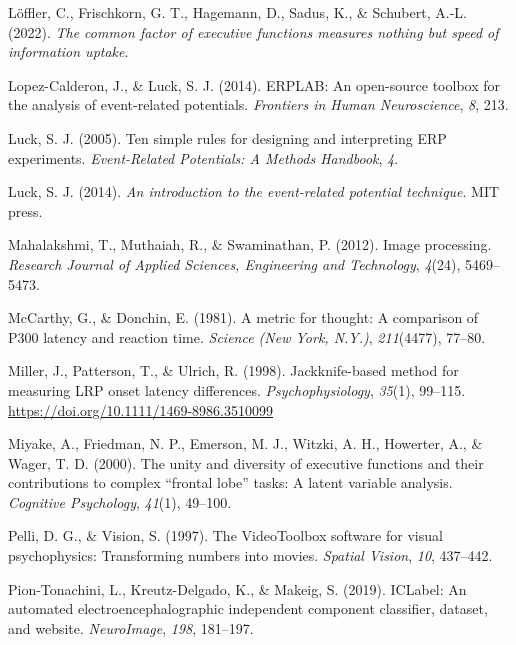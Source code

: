 \documentclass[
  man]{apa7}
\newlength{\cslhangindent}
\newlength{\cslentryspacingunit} %
\newenvironment{CSLReferences}[2] %
 {%
  \setlength{\parindent}{0pt}
  \ifodd #1
  \let\oldpar\par
  \def\par{\hangindent=\cslhangindent\oldpar}
  \fi
  \setlength{\parskip}{#2\cslentryspacingunit}
 }%
 {}
\begin{document}
\begin{CSLReferences}{1}{0}
\leavevmode{}%
Löffler, C., Frischkorn, G. T., Hagemann, D., Sadus, K., \& Schubert, A.-L. (2022). \emph{The common factor of executive functions measures nothing but speed of information uptake}.

\leavevmode{}%
Lopez-Calderon, J., \& Luck, S. J. (2014). {ERPLAB}: An open-source toolbox for the analysis of event-related potentials. \emph{Frontiers in Human Neuroscience}, \emph{8}, 213.

\leavevmode{}%
Luck, S. J. (2005). Ten simple rules for designing and interpreting {ERP} experiments. \emph{Event-Related Potentials: A Methods Handbook}, \emph{4}.

\leavevmode{}%
Luck, S. J. (2014). \emph{An introduction to the event-related potential technique}. MIT press.

\leavevmode{}%
Mahalakshmi, T., Muthaiah, R., \& Swaminathan, P. (2012). Image processing. \emph{Research Journal of Applied Sciences, Engineering and Technology}, \emph{4}(24), 5469--5473.

\leavevmode{}%
McCarthy, G., \& Donchin, E. (1981). A metric for thought: A comparison of {P300} latency and reaction time. \emph{Science (New York, N.Y.)}, \emph{211}(4477), 77--80.

\leavevmode{}%
Miller, J., Patterson, T., \& Ulrich, R. (1998). Jackknife-based method for measuring {LRP} onset latency differences. \emph{Psychophysiology}, \emph{35}(1), 99--115. \url{https://doi.org/10.1111/1469-8986.3510099}

\leavevmode{}%
Miyake, A., Friedman, N. P., Emerson, M. J., Witzki, A. H., Howerter, A., \& Wager, T. D. (2000). The unity and diversity of executive functions and their contributions to complex {``frontal lobe''} tasks: {A} latent variable analysis. \emph{Cognitive Psychology}, \emph{41}(1), 49--100.

\leavevmode{}%
Pelli, D. G., \& Vision, S. (1997). The {VideoToolbox} software for visual psychophysics: {Transforming} numbers into movies. \emph{Spatial Vision}, \emph{10}, 437--442.

\leavevmode{}%
Pion-Tonachini, L., Kreutz-Delgado, K., \& Makeig, S. (2019). {ICLabel}: {An} automated electroencephalographic independent component classifier, dataset, and website. \emph{NeuroImage}, \emph{198}, 181--197.


\end{CSLReferences}
\end{document}
